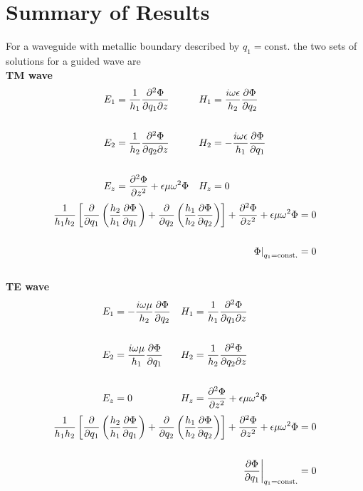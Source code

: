 \documentclass[twoside, a4paper]{article}
\begin{document}
\newpage
\section{Summary of Results}
\label{sec:waveguide-forumlae}
For a waveguide with metallic boundary described by $q_1 = \mathrm{const.}$ the two sets of solutions for a guided wave are \\

\textbf{TM wave}
\begin{align*}
E_1 & = \frac{1}{h_1} \frac{\partial^2 \Phi}{\partial q_1 \partial z}
& H_1 & =  \frac{i \omega \epsilon}{h_2} \frac{\partial \Phi}{\partial q_2} \\ \\
E_2 & = \frac{1}{h_2} \frac{\partial^2 \Phi}{\partial q_2 \partial z}
& H_2 & = -\frac{i \omega \epsilon}{h_1} \frac{\partial \Phi}{\partial q_1} \\ \\
E_z & = \frac{\partial^2 \Phi}{\partial z^2} + \epsilon \mu \omega^2 \Phi 
& H_z & = 0
\end{align*}
\begin{align*}
\frac{1}{h_1 h_2} 
\left[
\frac{\partial }{\partial q_1} \left(
		 \frac{h_2}{h_1} \frac{\partial \Phi}{\partial q_1}
\right)
 + \frac{\partial }{\partial q_2} \left(
		 \frac{h_1}{h_2} \frac{\partial \Phi}{\partial q_2}
\right)
\right]
+ \frac{\partial^2 \Phi}{\partial z^2} + \epsilon \mu \omega^2 \Phi
= 0 
\\ \\
\displaystyle
\left.
\Phi
\right|_{q_1 = \mathrm{const.}} = 0
\end{align*} \\

\textbf{TE wave}
\begin{align*}
E_1 & = -\frac{i \omega \mu}{h_2} \frac{\partial \Phi}{\partial q_2} &
H_1 & =  \frac{1}{h_1} \frac{\partial^2 \Phi}{\partial q_1 \partial z} \\ \\
E_2 & = \frac{i \omega \mu}{h_1} \frac{\partial \Phi}{\partial q_1}
& H_2 & = \frac{1}{h_2} \frac{\partial^2 \Phi}{\partial q_2 \partial z} \\ \\
E_z & = 0
& H_z & = \frac{\partial^2 \Phi}{\partial z^2} + \epsilon \mu \omega^2 \Phi 
\end{align*}
\begin{align*}
\frac{1}{h_1 h_2} 
\left[
\frac{\partial }{\partial q_1} \left(
		 \frac{h_2}{h_1} \frac{\partial \Phi}{\partial q_1}
\right)
 + \frac{\partial }{\partial q_2} \left(
		 \frac{h_1}{h_2} \frac{\partial \Phi}{\partial q_2}
\right)
\right]
+ \frac{\partial^2 \Phi}{\partial z^2} + \epsilon \mu \omega^2 \Phi
= 0 
\\ \\
\displaystyle
\left.
\frac{\partial \Phi}{\partial q_1}
\right|_{q_1 = \mathrm{const.}} = 0
\end{align*}

\newpage
\end{document}
